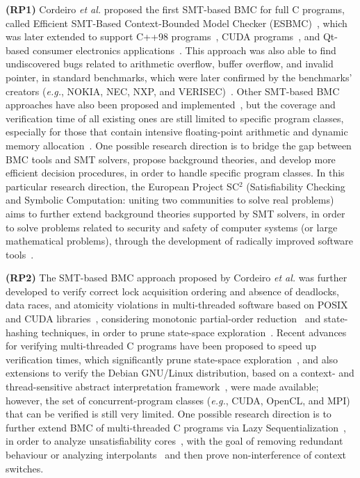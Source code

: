 \documentclass[format=acmsmall, review=false, screen=true]{acmart}
\begin{document}
\textbf{(RP1)} Cordeiro {\it et al.} proposed the first SMT-based BMC for full C programs, called Efficient SMT-Based Context-Bounded Model Checker (ESBMC)~\cite{Cordeiro12}, which was later extended to support C++98 programs~\cite{ECBS13}, CUDA programs~\cite{cudalucas,Pereira17}, and Qt-based consumer electronics applications~\cite{Sousa15}. This approach was also able to find undiscovered bugs related to arithmetic overflow, buffer overflow, and invalid pointer, in standard benchmarks, which were later confirmed by the benchmarks' creators ({\it e.g.}, NOKIA, NEC, NXP, and VERISEC)~\cite{CordeiroF11,Cordeiro12}. Other SMT-based BMC approaches have also been proposed and implemented~\cite{MerzFS12}, but the coverage and verification time of all existing ones are still limited to specific program classes, especially for those that contain intensive floating-point arithmetic and dynamic memory allocation~\cite{Beyer14,BeyerSVCOMP15}. One possible research direction is to bridge the gap between BMC tools and SMT solvers, propose background theories, and develop more efficient decision procedures, in order to handle specific program classes. In this particular research direction, the European Project SC$^2$ (Satisfiability Checking and Symbolic Computation: uniting two communities to solve real problems) aims to further extend background theories supported by SMT solvers, in order to solve problems related to security and safety of computer systems (or large mathematical problems), through the development of radically improved software tools~\cite{DBLP:journals/cca/AbrahamA0BBBCDE16}.

\textbf{(RP2)} The SMT-based BMC approach proposed by Cordeiro {\it et al.} was further developed to verify correct lock acquisition ordering and absence of deadlocks, data races, and atomicity violations in multi-threaded software based on POSIX and CUDA libraries~\cite{CordeiroF11,Pereira17}, considering monotonic partial-order reduction~\cite{KahlonWG09} and state-hashing techniques, in order to prune state-space exploration~\cite{morse15}. Recent advances for verifying multi-threaded C programs have been proposed to speed up verification times, which significantly prune state-space exploration~\cite{Inverso14,civl15}, and also extensions to verify the Debian GNU/Linux distribution, based on a context- and thread-sensitive abstract interpretation framework~\cite{DBLP:conf/kbse/KroeningPSW16}, were made available; however, the set of concurrent-program classes ({\it e.g.}, CUDA, OpenCL, and MPI) that can be verified is still very limited. One possible research direction is to further extend BMC of multi-threaded C programs via Lazy Sequentialization~\cite{Inverso14}, in order to analyze unsatisfiability cores~\cite{Grumberg05}, with the goal of removing redundant behaviour or analyzing interpolants~\cite{McMillan11} and then prove non-interference of context switches.
\end{document}
